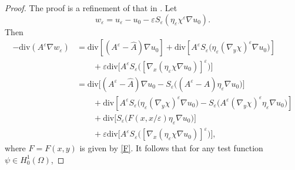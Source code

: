 \documentclass[reqno,12pt]{amsart} %
\theoremstyle{definition}
\theoremstyle{remark}
\numberwithin{equation}{section}
\newcommand{\e}{\varepsilon}
\begin{document}
\begin{proof}
    The proof is a refinement of that in \cite[Lemmas 3.2 and 4.1]{Niu20_reiterated}. Let
    \begin{equation}\label{def.we}
        w_\varepsilon=u_\varepsilon-u_0-\varepsilon S_\varepsilon(\eta_\varepsilon\chi^\varepsilon\nabla u_0).
    \end{equation}
    Then
    \begin{align*}
        -\mathrm{div}(A^\varepsilon \nabla w_{\varepsilon}) & =\mathrm{div}[(A^\varepsilon-\widehat{A})\nabla u_0]+\mathrm{div}[A^\varepsilon S_\varepsilon\big(\eta_\varepsilon(\nabla_y\chi)^\varepsilon\nabla u_0\big)]\\
        &\qquad+\varepsilon\mathrm{div}\big[A^\varepsilon S_\varepsilon\big([\nabla_x(\eta_\varepsilon\chi\nabla u_0)]^\varepsilon\big)\big]\\
        & = \mathrm{div}\big[(A^\varepsilon-\widehat{A})\nabla u_0-S_\varepsilon\big((A^\varepsilon-\widehat{A})\eta_\varepsilon \nabla u_0\big)\big]\\
        &\qquad + \mathrm{div}[A^\varepsilon S_\varepsilon\big(\eta_\varepsilon(\nabla_y\chi)^\varepsilon\nabla u_0\big)-S_\varepsilon\big(A^\varepsilon(\nabla_y\chi)^\varepsilon \eta_\varepsilon \nabla u_0\big)]\\
        &\qquad + \mathrm{div}\big[S_\varepsilon\big( F(x,x/\e) \eta_\varepsilon \nabla u_0\big)\big]\\
        & \qquad + \varepsilon\mathrm{div}\big[A^\varepsilon S_\varepsilon\big([\nabla_x(\eta_\varepsilon\chi\nabla u_0)]^\varepsilon\big)\big],
    \end{align*}
  where $F=F(x, y)$ is given by \eqref{F}.
    It follows that  for any test function $\psi\in H_0^1(\Omega)$,

\end{proof}
\end{document}

